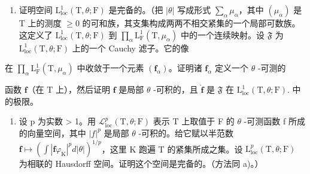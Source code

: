 \begin{enumerate}
\def\labelenumi{\alph{enumi})}
\tightlist
\item
  证明空间 \(\mathrm{L}_{\mathrm{loc}}^{1}(\mathrm{T},\theta ;\mathrm{F})\) 是完备的。（把 \(|\theta |\) 写成形式 \(\sum_{\alpha}\mu_{\alpha}\)，其中 \((\mu_{\alpha})\) 是 T 上的测度 \(\geqslant 0\) 的可和族，其支集构成两两不相交紧集的一个局部可数族。这定义了 \(\mathrm{L}_{\mathrm{loc}}^{1}(\mathrm{T},\theta ;\mathrm{F})\) 到 \(\prod_{\alpha}\mathrm{L}_{\mathrm{F}}^{1}(\mathrm{T},\mu_{\alpha})\) 中的一个连续映射。设 \(\mathfrak{F}\) 为 \(\mathrm{L}_{\mathrm{loc}}^{1}(\mathrm{T},\theta ;\mathrm{F})\) 上的一个 Cauchy 滤子。它的像
\end{enumerate}

在 \(\prod_{\alpha} \mathrm{L}_{\mathrm{F}}^{1}(\mathrm{T}, \mu_{\alpha})\) 中收敛于一个元素 \((\mathbf{f}_{\alpha})\)。证明诸 \(\mathbf{f}_{\alpha}\) 定义一个 \(\theta\) -可测的

函数 \(\mathbf{f}\)（在 \(\mathrm{T}\) 上），然后证明 \(\mathbf{f}\) 是局部 \(\theta\) -可积的，且 \(\dot{\mathbf{f}}\) 是 \(\mathfrak{F}\) 在 \(\mathrm{L}_{\mathrm{loc}}^{1}(\mathrm{T},\theta ;\mathrm{F}).\) 中的极限。

\begin{enumerate}
\def\labelenumi{\alph{enumi})}
\setcounter{enumi}{1}
\tightlist
\item
  设 p 为实数 \textgreater{} 1。用 \(\mathcal{L}_{\mathrm{loc}}^{p}(\mathrm{T},\theta;\mathrm{F})\) 表示 T 上取值于 F 的 \(\theta\) -可测函数 f 所成的向量空间，其中 \(|f|^{p}\) 是局部 \(\theta\) -可积的。给它赋以半范数 \(\mathbf{f} \mapsto (\int |\mathbf{f}\varphi_{\mathrm{K}}|^{p}d|\theta|)^{1/p}\)，这里 K 跑遍 T 的紧集所成之集。设 \(\mathrm{L}_{\mathrm{loc}}^{p}(\mathrm{T},\theta;\mathrm{F})\) 为相联的 Hausdorff 空间。证明这个空间是完备的。（方法同 a)。）
\end{enumerate}

\setcounter{exercisegroup}{6}
\edef\CurrentExerciseGroup{\arabic{exercisegroup}}
